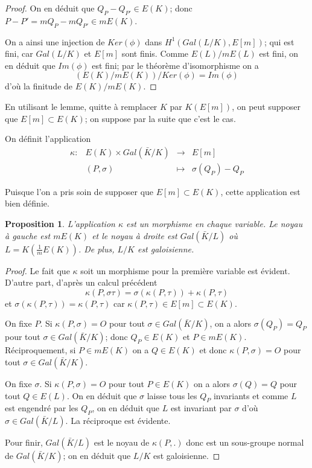 \documentclass{article}
\newtheorem{proposition}{Proposition}
\begin{document}
\begin{proof}
On en déduit que $Q_{P} - Q_{P'} \in E(K)$; donc $P - P' = mQ_{P} - mQ_{P'} \in mE(K)$.

On a ainsi une injection de $Ker(\phi)$ dans $H^1(Gal(L/K), E[m])$; qui est fini, car $Gal(L/K)$ et $E[m]$ sont finis.
Comme $E(L)/mE(L)$ est fini, on en déduit que $Im(\phi)$ est fini; par le théorème d'isomorphisme on a
\begin{equation*}
(E(K)/mE(K))/Ker(\phi) = Im(\phi)
\end{equation*}
d'où la finitude de $E(K)/mE(K)$.
\end{proof}

En utilisant le lemme, quitte à remplacer $K$ par $K(E[m])$,
on peut supposer que $E[m] \subset E(K)$; on suppose par la suite que c'est le cas.

On définit l'application
\begin{equation*}
\begin{array}{lrcl}
\kappa :&E(K) \times Gal(\bar{K}/K) & \longrightarrow & E[m] \\
	 & (P, \sigma) & \longmapsto & \sigma(Q_{P}) - Q_{P}
\end{array}
\end{equation*}

Puisque l'on a pris soin de supposer que $E[m] \subset E(K)$, cette application est bien définie.

\begin{proposition}
L'application $\kappa$ est un morphisme en chaque variable. Le noyau à gauche est $mE(K)$ et le noyau à droite
est $Gal(\bar{K}/L)$ où $L=K(\frac{1}{m}E(K))$. De plus, $L/K$ est galoisienne.
\end{proposition}

\begin{proof}
Le fait que $\kappa$ soit un morphisme pour la première variable est évident. D'autre part,
d'après un calcul précédent
\begin{equation*}
\kappa(P, \sigma \tau) = \sigma(\kappa(P, \tau)) + \kappa(P, \tau)
\end{equation*}
et $\sigma(\kappa(P, \tau)) = \kappa(P, \tau)$ car $\kappa(P, \tau) \in E[m] \subset E(K)$.

On fixe $P$. Si $\kappa(P, \sigma) = O$ pour tout $\sigma \in Gal(\bar{K}/K)$, on a alors 
$\sigma(Q_{P}) = Q_{P}$ pour tout $\sigma \in Gal(\bar{K}/K)$; donc $Q_{P}\in E(K)$ et $P \in mE(K)$.
Réciproquement, si $P \in mE(K)$ on a $Q \in E(K)$ et donc $\kappa(P, \sigma) = O$ pour tout 
$\sigma \in Gal(\bar{K}/K)$.

On fixe $\sigma$. Si $\kappa(P, \sigma) = O$ pour tout $P \in E(K)$ on a alors $\sigma(Q)=Q$ pour tout $Q\in E(L)$.
On en déduit que $\sigma$ laisse tous les $Q_{P}$ invariants et comme $L$ est engendré par les $Q_{P}$, on 
en déduit que $L$ est invariant par $\sigma$ d'où $\sigma \in Gal(\bar{K}/L)$. La réciproque est évidente.

Pour finir, $Gal(\bar{K}/L)$ est le noyau de $\kappa(P, .)$ donc est un sous-groupe normal de $Gal(\bar{K}/K)$;
on en déduit que $L/K$ est galoisienne.
\end{proof}
\end{document}
